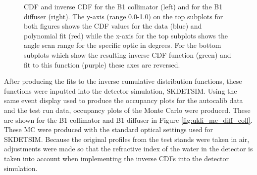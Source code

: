 \begin{figure}
\begin{subfigure}{0.5\textwidth}
    \end{subfigure}
    \caption{CDF and inverse CDF for the B1 collimator (left) and for the B1 diffuser (right). The y-axis (range 0.0-1.0) on the top subplots for both figures shows the CDF values for the data (blue) and polynomial fit (red) while the x-axis for the top subplots shows the angle scan range for the specific optic in degrees. For the bottom subplots which show the resulting inverse CDF function (green) and fit to this function (purple) these axes are reversed.}
    \label{fig:B1_PDF_CDF_inv_diff_coll}
\end{figure}


After producing the fits to the inverse cumulative distribution functions, these functions were inputted into the detector simulation, SKDETSIM. Using the same event display used to produce the occupancy plots for the autocalib data and the test run data, occupancy plots of the Monte Carlo were produced. These are shown for the B1 collimator and B1 diffuser in Figure \ref{fig:ukli_mc_diff_coll}. These MC were produced with the standard optical settings used for SKDETSIM. Because the original profiles from the test stands were taken in air, adjustments were made so that the refractive index of the water in the detector is taken into account when implementing the inverse CDFs into the detector simulation. 


